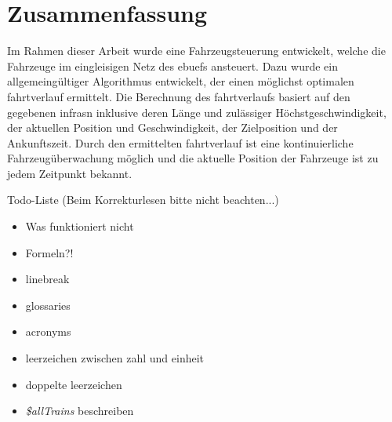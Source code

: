 \section*{Zusammenfassung}
Im Rahmen dieser Arbeit wurde eine Fahrzeugsteuerung entwickelt, welche die Fahrzeuge im eingleisigen Netz des \acfp{ebuef} ansteuert. Dazu wurde ein allgemeingültiger Algorithmus entwickelt, der einen möglichst optimalen \Gls{fahrtverlauf} ermittelt. Die Berechnung des \Gls{fahrtverlauf}s basiert auf den gegebenen \aclp{infra}n inklusive deren Länge und zulässiger Höchstgeschwindigkeit, der aktuellen Position und Geschwindigkeit, der Zielposition und der Ankunftszeit. Durch den ermittelten \Gls{fahrtverlauf} ist eine kontinuierliche Fahrzeugüberwachung möglich und die aktuelle Position der Fahrzeuge ist zu jedem Zeitpunkt bekannt.
\vspace{3cm}


\noindent Todo-Liste (Beim Korrekturlesen bitte nicht beachten...)
\begin{itemize}
\item Was funktioniert nicht
\item Formeln?!
\item linebreak
\item glossaries
\item acronyms
\item leerzeichen zwischen zahl und einheit
\item doppelte leerzeichen
\item \textit{\$allTrains} beschreiben
\end{itemize}